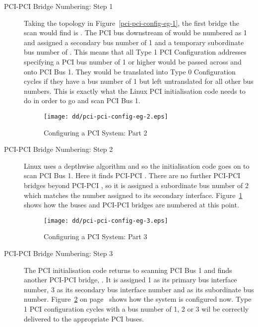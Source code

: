 \begin{description}
\item [PCI-PCI Bridge Numbering: Step 1]
Taking the topology in Figure~\ref{pci-pci-config-eg-1}, the first bridge
the scan would find is .   
The PCI bus downstream of  would be numbered as 1 and  
assigned a secondary bus number of 1 and a temporary subordinate bus number of .  
This means that all Type 1 PCI Configuration addresses specifying a PCI bus number
of 1 or higher would be passed across  and onto PCI Bus 1.
They would be translated into Type 0 Configuration cycles if they have a bus number
of 1 but left untranslated for all other bus numbers.
This is exactly what the Linux PCI initialisation code needs to do in order 
to go and scan PCI Bus 1.

\begin{figure}
\begin{center}
{\centering \texttt{[image: dd/pci-pci-config-eg-2.eps]} \par}
\end{center}
\caption{Configuring a PCI System: Part 2}
\label{pci-pci-config-eg-2}
\end{figure}
\item [PCI-PCI Bridge Numbering: Step 2]
Linux uses a depthwise algorithm and so the initialisation code goes
on to scan PCI Bus 1.
Here it finds PCI-PCI .  
There are no further PCI-PCI bridges beyond PCI-PCI , 
so it is assigned a subordinate bus number of 2 which 
matches the number assigned to its secondary interface.   
Figure~\ref{pci-pci-config-eg-2} shows how the buses and
PCI-PCI bridges are numbered at this point.

\begin{figure}
\begin{center}
{\centering \texttt{[image: dd/pci-pci-config-eg-3.eps]} \par}
\end{center}
\caption{Configuring a PCI System: Part 3}
\label{pci-pci-config-eg-3}
\end{figure}
\item [PCI-PCI Bridge Numbering: Step 3]
The PCI initialisation code returns to scanning PCI Bus 1 and finds another 
PCI-PCI bridge, .
It is assigned 1 as its primary bus interface number, 3 as its secondary bus 
interface number and  as its subordinate bus number.
Figure~\ref{pci-pci-config-eg-3} on 
page~\pageref{pci-pci-config-eg-3} shows how the system is configured now.
Type 1 PCI configuration cycles with a bus number of 1, 2 or 3 wil be correctly
delivered to the appropriate PCI buses.


\end{description}
